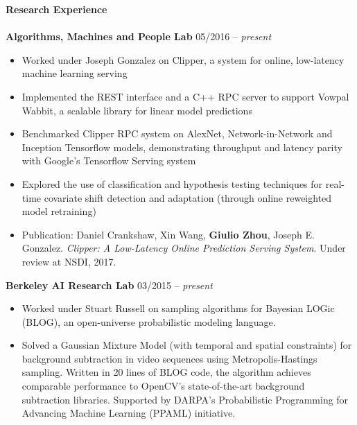 \documentclass{article}
\begin{document}
\noindent
\textbf{{\Large Research Experience}}\\[-2mm]
\HRule\\
\noindent
\textbf{Algorithms, Machines and People Lab}
\hfill 05/2016 -- \textit{present}
\begin{itemize}
\vspace{-1.8mm}
\item Worked under Joseph Gonzalez on Clipper, a system for online, low-latency machine learning serving
\vspace{-2.5mm}
\item Implemented the REST interface and a C++ RPC server to support Vowpal Wabbit, a scalable library for linear model predictions
\vspace{-2.5mm}
\item Benchmarked Clipper RPC system on AlexNet, Network-in-Network and Inception Tensorflow models, demonstrating throughput and latency parity with Google's Tensorflow Serving system
\vspace{-2.5mm}
\item Explored the use of classification and hypothesis testing techniques for real-time covariate shift detection and adaptation (through online reweighted model retraining)
\vspace{-2.5mm}
\item Publication: Daniel Crankshaw, Xin Wang, \textbf{Giulio Zhou}, Joseph E. Gonzalez. \textit{Clipper: A Low-Latency Online Prediction Serving System}. Under review at NSDI, 2017. 
\end{itemize}

\noindent
\textbf{Berkeley AI Research Lab}
\hfill 03/2015 -- \textit{present}
\begin{itemize}
\vspace{-1.8mm}
\item Worked under Stuart Russell on sampling algorithms for Bayesian LOGic (BLOG), an open-universe probabilistic modeling language.
\vspace{-2.5mm}
\item Solved a Gaussian Mixture Model (with temporal and spatial constraints) for background subtraction in video sequences using Metropolis-Hastings sampling. Written in 20 lines of BLOG code, the algorithm achieves comparable performance to OpenCV's state-of-the-art background subtraction libraries. Supported by DARPA's Probabilistic Programming for Advancing Machine Learning (PPAML) initiative.
\end{itemize}
\end{document}
